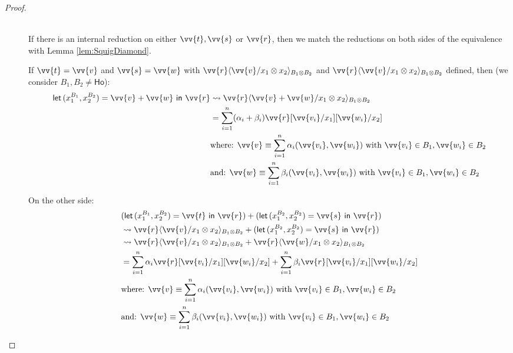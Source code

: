 \documentclass[runningheads,orivec,envcountsame,envcountsect]{llncs}
\newcommand\ansubst[2]{\ensuremath{\langle #1 \rangle_{#2}}}
\newcommand\AbsBasis{\ensuremath{\mathsf{Ho}}}
\def\Pair#1#2{(#1,#2)} %
\def\letkeyword{\mathsf{let}}
\def\inkeyword{\mathsf{in}}
\def\LetP#1#2#3#4#5#6{\letkeyword\,\Pair{#1^{#2}}{#3^{#4}}=#5~\inkeyword~#6}
\def\lraneq{\rightsquigarrow}
\begin{document}
\begin{proof}
\begin{description}
    \item[\parbox{.75\linewidth}{\begin{align*}
      &\LetP{x_1}{B_1}{x_2}{B_2}{\vv{t}+\vv{s}}{\vv{r}}\equiv\\
      &(\LetP{x_1}{B_1}{x_2}{B_2}{\vv{t}}{\vv{r}}) +
      (\LetP{x_1}{B_2}{x_2}{B_2}{\vv{s}}{\vv{r}})
      \end{align*}}:]\hfill\\
      If there is an internal reduction on either $\vv{t}, \vv{s}$ or $\vv{r}$, then we match the reductions on both sides of the equivalence with Lemma \ref{lem:SquigDiamond}.

      If $\vv{t}=\vv{v}$ and $\vv{s}=\vv{w}$ with $\vv{r}\ansubst{\vv{v}/x_1\otimes x_2}{B_1\otimes B_2}$ and $\vv{r}\ansubst{\vv{v}/x_1\otimes x_2}{B_1\otimes B_2}$ defined, then (we consider $B_1,B_2\neq\AbsBasis$):
      \begin{align*}
      \LetP{x_1}{B_1}{x_2}{B_2}{\vv{v}+\vv{w}}{\vv{r}}&\lraneq\vv{r}\ansubst{\vv{v}+\vv{w}/x_1\otimes x_2}{B_1\otimes B_2}\\
      &=\sum_{i=1}^n (\alpha_i+\beta_i) \vv{r}[\vv{v_i}/x_1][\vv{w_i}/x_2]\\
      &\text{where: }\vv{v}\equiv\sum_{i=1}^n\alpha_i\Pair{\vv{v_i}}{\vv{w_i}} \text{ with } \vv{v_i}\in B_1, \vv{w_i}\in B_2\\
      &\text{and: }\vv{w}\equiv\sum_{i=1}^n\beta_i\Pair{\vv{v_i}}{\vv{w_i}} \text{ with } \vv{v_i}\in B_1, \vv{w_i}\in B_2\\
      \end{align*}

      On the other side:
      \begin{align*}
      &(\LetP{x_1}{B_1}{x_2}{B_2}{\vv{t}}{\vv{r}}) + (\LetP{x_1}{B_2}{x_2}{B_2}{\vv{s}}{\vv{r}})\\
      &\lraneq\vv{r}\ansubst{\vv{v}/x_1\otimes x_2}{B_1\otimes B_2} + (\LetP{x_1}{B_2}{x_2}{B_2}{\vv{s}}{\vv{r}})\\
      &\lraneq\vv{r}\ansubst{\vv{v}/x_1\otimes x_2}{B_1\otimes B_2} + \vv{r}\ansubst{\vv{w}/x_1\otimes x_2}{B_1\otimes B_2}\\
      &=\sum_{i=1}^n\alpha_i\vv{r}[\vv{v_i}/x_1][\vv{w_i}/x_2] + \sum_{i=1}^n \beta_i \vv{r}[\vv{v_i}/x_1][\vv{w_i}/x_2]\\
      &\text{where: }\vv{v}\equiv\sum_{i=1}^n\alpha_i\Pair{\vv{v_i}}{\vv{w_i}} \text{ with } \vv{v_i}\in B_1, \vv{w_i}\in B_2\\
      &\text{and: }\vv{w}\equiv\sum_{i=1}^n\beta_i\Pair{\vv{v_i}}{\vv{w_i}} \text{ with } \vv{v_i}\in B_1, \vv{w_i}\in B_2\\
      \end{align*}
        

\end{description}
\end{proof}
\end{document}
